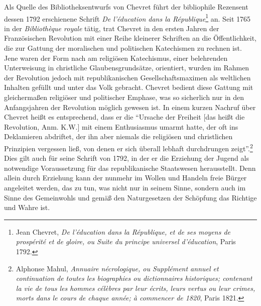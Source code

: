 Als Quelle des Bibliotheksentwurfs von Chevret führt der bibliophile
Rezensent dessen 1792 erschienene Schrift \emph{De l'éducation dans la
République}\footnote{Jean Chevret, \emph{De l'éducation dans la
  République, et de ses moyens de prospérité et de gloire, ou Suite du
  principe universel d'éducation}, Paris 1792.} an. Seit 1765 in der
\emph{Bibliothèque royale} tätig, trat Chevret in den ersten Jahren der
Französischen Revolution mit einer Reihe kleinerer Schriften an die
Öffentlichkeit, die zur Gattung der moralischen und politischen
Katechismen zu rechnen ist. Jene waren der Form nach am religiösen
Katechismus, einer belehrenden Unterweisung in christliche
Glaubensgrundsätze, orientiert, wurden im Rahmen der Revolution jedoch
mit republikanischen Gesellschaftsmaximen als weltlichen Inhalten
gefüllt und unter das Volk gebracht. Chevret bedient diese Gattung mit
gleichermaßen religiöser und politischer Emphase, was so sicherlich nur
in den Anfangsjahren der Revolution möglich gewesen ist. In einem kurzen
Nachruf über Chevret heißt es entsprechend, dass er die \enquote{Ursache
der Freiheit {[}das heißt die Revolution, Anm. K.W.{]} mit einem
Enthusiasmus umarmt hatte, der oft ins Deklamieren abdriftet, der ihn
aber niemals die religiösen und christlichen Prinzipien vergessen ließ,
von denen er sich überall lebhaft durchdrungen zeigt}.\footnote{Alphonse
  Mahul, \emph{Annuaire nécrologique, ou Supplément annuel et
  continuation de toutes les biographies ou dictionnaires historiques;
  contenant la vie de tous les hommes célèbres par leur écrits, leurs
  vertus ou leur crimes, morts dans le cours de chaque année; à
  commencer de 1820}, Paris 1821.} Dies gilt auch für seine Schrift von
1792, in der er die Erziehung der Jugend als notwendige Voraussetzung
für das republikanische Staatswesen herausstellt. Denn allein durch
Erziehung kann der nunmehr im Wollen und Handeln freie Bürger angeleitet
werden, das zu tun, was nicht nur in seinem Sinne, sondern auch im Sinne
des Gemeinwohls und gemäß den Naturgesetzen der Schöpfung das Richtige
und Wahre ist.

